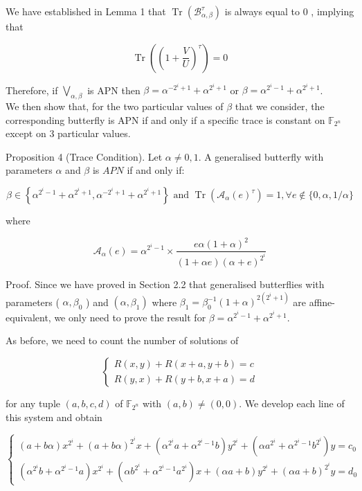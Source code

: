 \documentclass[10pt]{article}
\begin{document}
We have established in Lemma 1 that $\operatorname{Tr}\left(\mathcal{B}_{\alpha, \beta}^{\tau}\right)$ is always equal to 0 , implying that

$$
\operatorname{Tr}\left(\left(1+\frac{V}{U}\right)^{\tau}\right)=0
$$

Therefore, if $\bigvee_{\alpha, \beta}$ is APN then $\beta=\alpha^{-2^{i}+1}+\alpha^{2^{i}+1}$ or $\beta=\alpha^{2^{i}-1}+\alpha^{2^{i}+1}$.\\
We then show that, for the two particular values of $\beta$ that we consider, the corresponding butterfly is APN if and only if a specific trace is constant on $\mathbb{F}_{2^{n}}$ except on 3 particular values.

Proposition 4 (Trace Condition). Let $\alpha \neq 0,1$. A generalised butterfly with parameters $\alpha$ and $\beta$ is $A P N$ if and only if:

$$
\beta \in\left\{\alpha^{2^{i}-1}+\alpha^{2^{i}+1}, \alpha^{-2^{i}+1}+\alpha^{2^{i}+1}\right\} \text { and } \operatorname{Tr}\left(\mathcal{A}_{\alpha}(e)^{\tau}\right)=1, \forall e \notin\{0, \alpha, 1 / \alpha\}
$$

where

$$
\mathcal{A}_{\alpha}(e)=\alpha^{2^{i}-1} \times \frac{e \alpha(1+\alpha)^{2}}{(1+\alpha e)(\alpha+e)^{2^{i}}}
$$

Proof. Since we have proved in Section 2.2 that generalised butterflies with parameters ( $\alpha, \beta_{0}$ ) and $\left(\alpha, \beta_{1}\right)$ where $\beta_{1}=\beta_{0}^{-1}(1+\alpha)^{2\left(2^{i}+1\right)}$ are affine-equivalent, we only need to prove the result for $\beta=\alpha^{2^{i}-1}+\alpha^{2^{i}+1}$.

As before, we need to count the number of solutions of

\[
\left\{\begin{array}{l}
R(x, y)+R(x+a, y+b)=c  \tag{3}\\
R(y, x)+R(y+b, x+a)=d
\end{array}\right.
\]

for any tuple $(a, b, c, d)$ of $\mathbb{F}_{2^{n}}$ with $(a, b) \neq(0,0)$. We develop each line of this system and obtain

$$
\left\{\begin{array}{l}
(a+b \alpha) x^{2^{i}}+(a+b \alpha)^{2^{i}} x+\left(\alpha^{2^{i}} a+\alpha^{2^{i}-1} b\right) y^{2^{i}}+\left(\alpha a^{2^{i}}+\alpha^{2^{i}-1} b^{2^{i}}\right) y=c_{0} \\
\left(\alpha^{2^{i}} b+\alpha^{2^{i}-1} a\right) x^{2^{i}}+\left(\alpha b^{2^{i}}+\alpha^{2^{i}-1} a^{2^{i}}\right) x+(\alpha a+b) y^{2^{i}}+(\alpha a+b)^{2^{i}} y=d_{0}
\end{array}\right.
$$
\end{document}
